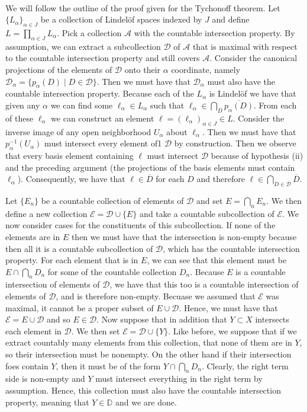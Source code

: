 \documentclass{article}
\DeclareMathOperator{\suchthat}{\mathrel{|}}
\newcommand{\problem}[1]{\noindent{\textbf{Problem #1}}\\}
\newcommand{\problempart}[1]{\noindent{\textbf{(#1)}}}
\begin{document}
\problem{5.37.3}
\problempart{a} We will follow the outline of the proof given for the Tychonoff theorem. Let $\{L_\alpha\}_{\alpha \in J}$ be a collection of Lindel\"{o}f spaces indexed by $J$ and define $L = \prod_{\alpha \in J} L_\alpha$. Pick a collection $\mathcal{A}$ with the countable intersection property. By assumption, we can extract a subcollection $\mathcal{D}$ of $\mathcal{A}$ that is maximal with respect to the countable intersection property and still covers $\mathcal{A}$. Consider the canonical projections of the elements of $\mathcal{D}$ onto their $\alpha$ coordinate, namely $\mathcal{D}_\alpha = \{p_\alpha(D) \suchthat D \in \mathcal{D}\}$. Then we must have that $\mathcal{D}_\alpha$ must also have the countable intersection property. Because each of the $L_\alpha$ is Lindel\"{o}f we have that given any $\alpha$ we can find some $\ell_\alpha \in L_\alpha$ such that $\ell_\alpha \in \bigcap_{D} \overline{p_\alpha(D)}$. From each of these $\ell_\alpha$ we can construct an element $\ell = (\ell_\alpha)_{\alpha \in J} \in L$. Consider the inverse image of any open neighborhood $U_\alpha$ about $\ell_\alpha$. Then we must have that $p_\alpha^{-1}(U_\alpha)$ must intersect every element of1 $\mathcal{D}$ by construction. Then we observe that every basis element containing $\ell$ must intersect $\mathcal{D}$ because of hypothesis (ii) and the preceding argument (the projections of the basis elements must contain $\ell_\alpha$). Consequently, we have that $\ell \in \overline{D}$ for each $D$ and therefore $\ell \in \bigcap_{D \in \mathcal{D}}\overline{D}$.   

\problempart{b} Let $\{E_n\}$ be a countable collection of elements of $\mathcal{D}$ and set $E = \bigcap_n E_n$. We then define a new collection $\mathcal{E} = \mathcal{D} \cup \{E\}$ and take a countable subcollection of $\mathcal{E}$. We now consider cases for the constituents of this subcollection. If none of the elements are in $E$ then we must have that the intersection is non-empty because then all it is a countable subcollection of $\mathcal{D}$, which has the countable intersection property. For each element that is in $E$, we can see that this element must be $E \cap \bigcap_n D_n$ for some of the countable collection $D_n$. Because $E$ is a countable intersection of elements of $\mathcal{D}$, we have that this too is a countable intersection of elements of $\mathcal{D}$, and is therefore non-empty. Becuase we assumed that $\mathcal{E}$ was maximal, it cannot be a proper subset of $E \cup \mathcal{D}$. Hence, we must have that $\mathcal{E} = E \cup \mathcal{D}$ and so $E \in \mathcal{D}$. Now suppose that in addition that $Y \subset X$ intersects each element in $\mathcal{D}$. We then set $\mathcal{E} = \mathcal{D}\cup \{Y\}$. Like before, we suppose that if we extract countably many elements from this collection, that none of them are in $Y$, so their intersection must be nonempty. On the other hand if their intersection foes contain $Y$, then it must be of the form $Y \cap \bigcap_n D_n$. Clearly, the right term side is non-empty and $Y$ must intersect everything in the right term by assumption. Hence, this collection must also have the countable intersection property, meaning that $Y \in \mathbb{D}$ and we are done. 
\end{document}

